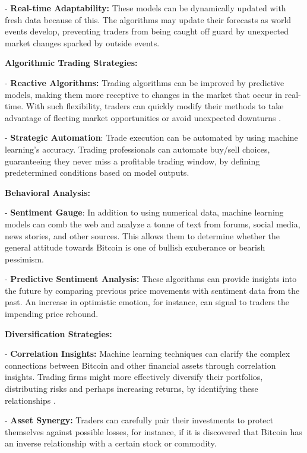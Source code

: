 -	\textbf{Real-time Adaptability: }These models can be dynamically updated with fresh data because of this. The algorithms may update their forecasts as world events develop, preventing traders from being caught off guard by unexpected market changes sparked by outside events.

\textbf{Algorithmic Trading Strategies:}

-\textbf{	Reactive Algorithms:} Trading algorithms can be improved by predictive models, making them more receptive to changes in the market that occur in real-time. With such flexibility, traders can quickly modify their methods to take advantage of fleeting market opportunities or avoid unexpected downturns \citep{DBLP:journals/cacm/TreleavenGL13}.

-	\textbf{Strategic Automation}: Trade execution can be automated by using machine learning's accuracy. Trading professionals can automate buy/sell choices, guaranteeing they never miss a profitable trading window, by defining predetermined conditions based on model outputs.

\textbf{Behavioral Analysis:}

-	\textbf{Sentiment Gauge}: In addition to using numerical data, machine learning models can comb the web and analyze a tonne of text from forums, social media, news stories, and other sources. This allows them to determine whether the general attitude towards Bitcoin is one of bullish exuberance or bearish pessimism\citep{kristoufek2015main}.

-	\textbf{Predictive Sentiment Analysis:} These algorithms can provide insights into the future by comparing previous price movements with sentiment data from the past. An increase in optimistic emotion, for instance, can signal to traders the impending price rebound.

\textbf{Diversification Strategies:}

-	\textbf{Correlation Insights:} Machine learning techniques can clarify the complex connections between Bitcoin and other financial assets through correlation insights. Trading firms might more effectively diversify their portfolios, distributing risks and perhaps increasing returns, by identifying these relationships \citep{phillips2017predicting}.

-	\textbf{Asset Synergy:} Traders can carefully pair their investments to protect themselves against possible losses, for instance, if it is discovered that Bitcoin has an inverse relationship with a certain stock or commodity.

